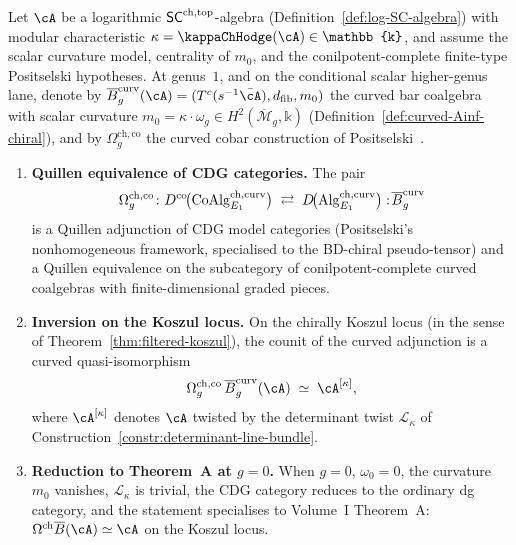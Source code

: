 \begin{theorem}
\label{thm:curved-bar-cobar-genus-ge-1}
Let $\cA$ be a logarithmic $\mathsf{SC}^{\mathrm{ch},\mathrm{top}}$-algebra
(Definition~\textup{\ref{def:log-SC-algebra}}) with modular
characteristic $\kappa = \kappaChHodge(\cA) \in \mathbb{k}$, and assume the
scalar curvature model, centrality of $m_0$, and the
conilpotent-complete finite-type Positselski hypotheses. At
genus~$1$, and on the conditional scalar higher-genus lane, denote by
$\barB^{\mathrm{curv}}_g(\cA) =
(T^c(s^{-1}\bar\cA), \dfib, m_0)$ the curved bar coalgebra with
scalar curvature $m_0 = \kappa \cdot \omega_g \in
H^2(\overline{\mathcal M}_g, \mathbb{k})$
\textup{(}Definition~\textup{\ref{def:curved-Ainf-chiral}}\textup{)},
and by $\Omega^{\mathrm{ch,co}}_g$ the curved cobar construction of
Positselski~\cite{Positselski2011}.
\begin{enumerate}[label=\textup{(\roman*)}]
\item \textbf{Quillen equivalence of CDG categories.} The pair
 \[
 \Omega^{\mathrm{ch,co}}_g \colon
 D^{\mathrm{co}}\!\bigl(\mathrm{CoAlg}_{E_1}^{\mathrm{ch,curv}}\bigr)
 \;\rightleftarrows\;
 D\!\bigl(\mathrm{Alg}_{E_1}^{\mathrm{ch,curv}}\bigr)
 :\! \overline{B}^{\mathrm{curv}}_g
 \]
 is a Quillen adjunction of CDG model categories
 \textup{(}Positselski's nonhomogeneous framework, specialised to
 the BD-chiral pseudo-tensor\textup{)} and a Quillen equivalence
 on the subcategory of conilpotent-complete curved coalgebras
 with finite-dimensional graded pieces.
\item \textbf{Inversion on the Koszul locus.} On the chirally
 Koszul locus \textup{(}in the sense of
 Theorem~\textup{\ref{thm:filtered-koszul}}\textup{)}, the counit
 of the curved adjunction is a curved quasi-isomorphism
 \[
 \Omega^{\mathrm{ch,co}}_g\,\barB^{\mathrm{curv}}_g(\cA)
 \;\simeq\;
 \cA^{[\kappa]},
 \]
 where $\cA^{[\kappa]}$ denotes $\cA$ twisted by the determinant
 twist $\mathcal{L}_\kappa$ of
 Construction~\textup{\ref{constr:determinant-line-bundle}}.
\item \textbf{Reduction to Theorem~A at $g=0$.} When $g = 0$,
 $\omega_0 = 0$, the curvature $m_0$ vanishes,
 $\mathcal{L}_\kappa$ is trivial, the CDG category reduces to the
 ordinary dg category, and the statement specialises to
 Volume~I Theorem~A: $\Omegach \barB(\cA) \simeq \cA$ on the
 Koszul locus.
\end{enumerate}
\end{theorem}

